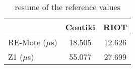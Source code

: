 \begin{table}[!ht]
  \centering
  \begin{tabular}{l|c|c}
                   & Contiki  & RIOT    \\ \hline
  RE-Mote ($\mu$s) & 18.505  & 12.626   \\
  Z1 ($\mu$s)      & 55.077   & 27.699
  \end{tabular}
  \caption{resume of the reference values}
  \label{tab:reference-values-resume}
  \end{table}